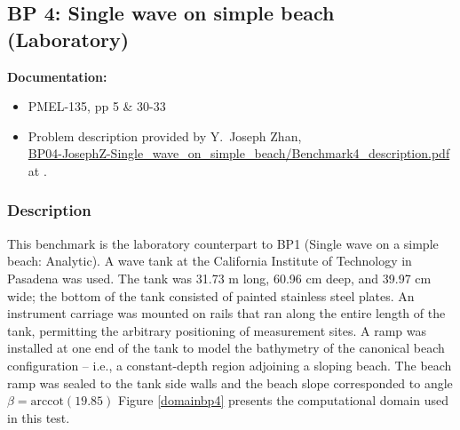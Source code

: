 \newsection

\subsection{BP 4:
 Single wave on simple beach (Laboratory)}


{\bf Documentation:}
\begin {itemize}

\item PMEL-135, pp 5 \& 30-33
\item Problem description provided by Y.\ Joseph Zhan,\\
\href{https://github.com/rjleveque/nthmp-benchmark-problems/blob/master/BP04-JosephZ-Single_wave_on_simple_beach/Benchmark4_description.pdf}
{BP04-JosephZ-Single\_wave\_on\_simple\_beach/Benchmark4\_description.pdf} 
at \cite{bp-description}.  
\end {itemize}

\subsubsection{Description}
This benchmark is the laboratory counterpart to BP1 (Single wave on a simple beach: Analytic).  A wave tank at the California Institute of Technology in Pasadena was used.  The tank was 31.73 m long, 60.96 cm deep, and 39.97 cm wide; the bottom of the tank consisted of painted stainless
steel plates.  An instrument carriage was mounted on rails that ran along the entire length of the tank, permitting the arbitrary positioning of measurement sites.  A ramp was installed at one end of the tank to model the bathymetry of the canonical beach configuration -- i.e., a constant-depth region adjoining a sloping beach.  The beach ramp was sealed to the tank side walls and the beach slope corresponded to angle $\beta = \text{arccot}(19.85)$  Figure \ref{domainbp4} presents the computational domain used in this test.  

